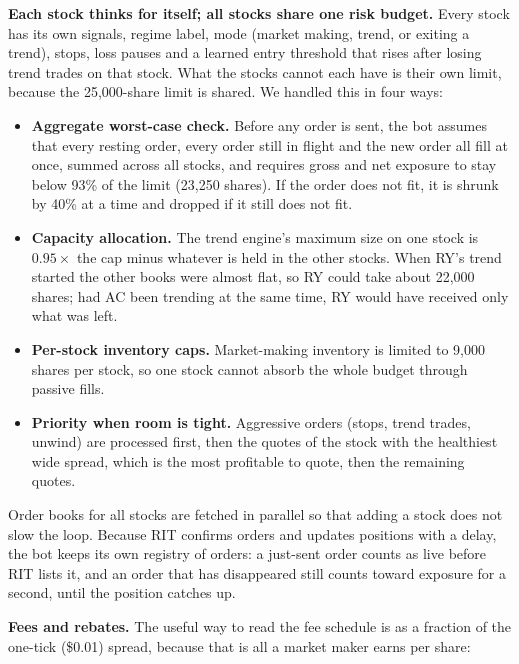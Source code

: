 \textbf{Each stock thinks for itself; all stocks share one risk budget.} Every stock has its own signals, regime label, mode (market making, trend, or exiting a trend),
stops, loss pauses and a learned entry threshold that rises after losing trend trades on that stock. What the stocks cannot each have is their own limit, because the
25{,}000-share limit is shared. We handled this in four ways:
\begin{itemize}
  \item \textbf{Aggregate worst-case check.} Before any order is sent, the bot assumes that every resting order, every order still in flight and the new order all fill at once,
        summed across all stocks, and requires gross and net exposure to stay below 93\% of the limit (23{,}250 shares). If the order does not fit, it is shrunk by 40\% at a time
        and dropped if it still does not fit.
  \item \textbf{Capacity allocation.} The trend engine's maximum size on one stock is $0.95\times$ the cap minus whatever is held in the other stocks. When RY's trend started the
        other books were almost flat, so RY could take about 22{,}000 shares; had AC been trending at the same time, RY would have received only what was left.
  \item \textbf{Per-stock inventory caps.} Market-making inventory is limited to 9{,}000 shares per stock, so one stock cannot absorb the whole budget through passive fills.
  \item \textbf{Priority when room is tight.} Aggressive orders (stops, trend trades, unwind) are processed first, then the quotes of the stock with the healthiest wide spread,
        which is the most profitable to quote, then the remaining quotes.
\end{itemize}
Order books for all stocks are fetched in parallel so that adding a stock does not slow the loop. Because RIT confirms orders and updates positions with a delay, the bot keeps its own
registry of orders: a just-sent order counts as live before RIT lists it, and an order that has disappeared still counts toward exposure for a second, until the position catches up.

\textbf{Fees and rebates.} The useful way to read the fee schedule is as a fraction of the one-tick (\$0.01) spread, because that is all a market maker earns per share:


